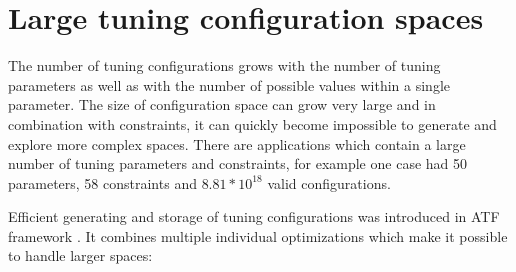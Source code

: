 \documentclass[
  digital,     %
  oneside,     %
  nosansbold,  %
  nocolorbold, %
  lof,         %
  lot,         %
  nocover
]{fithesis4}
\begin{document}
\section{Large tuning configuration spaces}
The number of tuning configurations grows with the number of tuning parameters as well as with the number of possible values within a single parameter. The size of configuration space can grow very large and in combination with constraints, it can quickly become impossible to generate and explore more complex spaces. There are applications which contain a large number of tuning parameters and constraints, for example one case had 50 parameters, 58 constraints and $ 8.81 * 10^{18} $ valid configurations.

Efficient generating and storage of tuning configurations was introduced in ATF framework \cite{rash2021configurations}. It combines multiple individual optimizations which make it possible to handle larger spaces:
\end{document}
